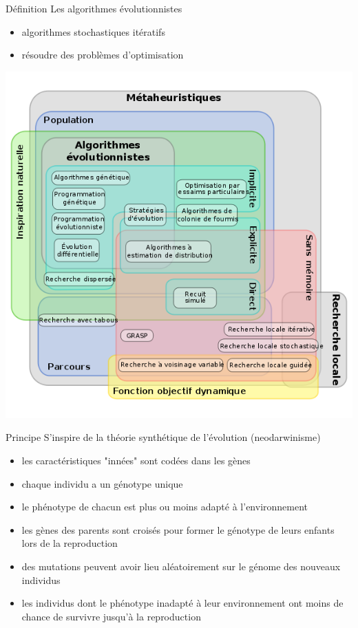 \documentclass{beamer}
\begin{document}
\begin{frame}{Définition}
    Les algorithmes évolutionnistes
    \begin{itemize}
        \item algorithmes stochastiques itératifs
        \item résoudre des problèmes d'optimisation
    \end{itemize}
    \begin{center}
            \includegraphics[width=.60\linewidth]{images/metaheuristiques}
    \end{center}
\end{frame}

\begin{frame}{Principe}
    S'inspire de la théorie synthétique de l'évolution (neodarwinisme)
    \begin{itemize}
        \item les caractéristiques "innées" sont codées dans les gènes
        \item chaque individu a un génotype unique
        \item le phénotype de chacun est plus ou moins adapté à
              l'environnement
        \item les gènes des parents sont croisés pour former le génotype
              de leurs enfants lors de la reproduction
        \item des mutations peuvent avoir lieu aléatoirement sur le génome
              des nouveaux individus
        \item les individus dont le phénotype inadapté à leur environnement
              ont moins de chance de survivre jusqu'à la reproduction
    \end{itemize}
\end{frame}
\end{document}
